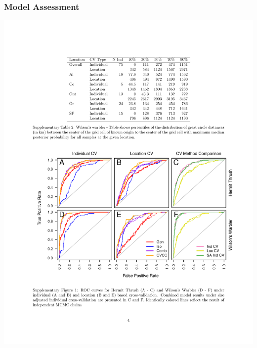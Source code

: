 \documentclass[t]{beamer}\usepackage[]{graphicx}\usepackage[]{color}
\begin{document}
\begin{frame}
\frametitle{Model Assessment}

\vspace{-3mm}

\begin{center}
\includegraphics[width=\textwidth]{figs/ROCs.pdf}
\end{center}

\end{frame}

\end{document}
